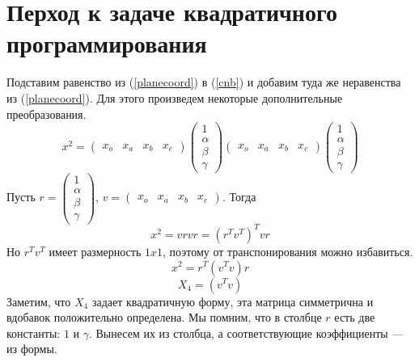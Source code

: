 \documentclass[pdftex,ptm,12pt,a4paper]{report}
\begin{document}
\section{Перход к задаче квадратичного программирования}
    Подставим равенство из (\ref{planecoord}) в (\ref{cnb}) и добавим туда же неравенства из (\ref{planecoord}).
    Для этого произведем некоторые дополнительные преобразования.
    \[
      x^2 = \begin{pmatrix} x_o & x_a & x_b & x_c \end{pmatrix}
             \begin{pmatrix} 1 \\ \alpha \\ \beta \\ \gamma \end{pmatrix}
             \begin{pmatrix} x_o & x_a & x_b & x_c \end{pmatrix}
             \begin{pmatrix} 1 \\ \alpha \\ \beta \\ \gamma \end{pmatrix}
    \]
    Пусть $r = \begin{pmatrix} 1 \\ \alpha \\ \beta \\ \gamma \end{pmatrix} $,
          $v = \begin{pmatrix} x_o & x_a & x_b & x_c \end{pmatrix}$.
    Тогда
    \[
      x^2 = v r v r = (r^T v^T)^T v r
    \]
    Но $r^T v^T$ имеет размерность $1x1$, поэтому от транспонирования можно избавиться.
    \[
      x^2 = r^T (v^T v) r
    \]\[
      X_4 = (v^T v)
    \]
    Заметим, что $X_4$ задает квадратичную форму, эта матрица симметрична и вдобавок положительно определена.
    Мы помним, что в столбце $r$ есть две константы: $1$ и $\gamma$.
    Вынесем их из столбца, а соответствующие коэффициенты --- из формы.
\end{document}
